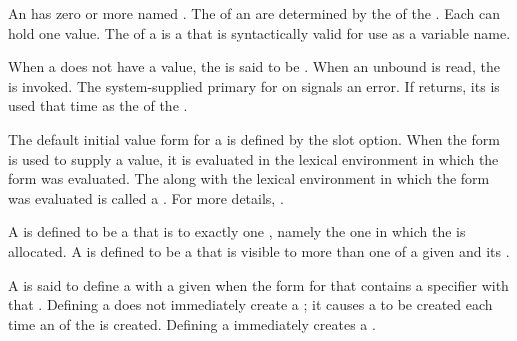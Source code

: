 
                    
An   has zero or more named
.  The  of an  are determined 
by the  of the .  Each  can hold
one value.
The  of a  is a  that is syntactically
valid for use as a variable name.

When a  does not have a value, the  is said to be 
.  When an unbound  is read,
the   is invoked. The 
system-supplied primary  
for  
on   signals an error.
If  returns, its  
is used that time as the  of the .

The default initial value form for a  is defined by
the  slot option.  When the  form is used to
supply a value, it is evaluated in the lexical environment in which
the  form was evaluated. The  along with
the lexical environment in which the  form was evaluated
is called a . 
For more details, \seesection\ObjectCreationAndInit.
             
A  is defined to be a  that is
to exactly one , 
namely the one in which the  is allocated.  
A  is defined to be a  that is visible to more than one
 of a given  and its .

A  is said to define a  with a given  when
the  form for that  contains a  specifier with
that .  Defining a  does not immediately create 
a ; it causes a  to be created each time 
an  of the  is created.
Defining a  immediately creates a .
                                                    

